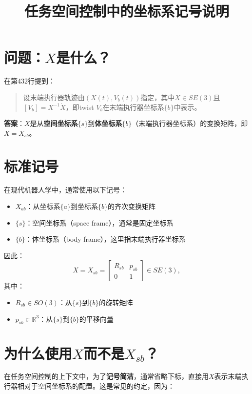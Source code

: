 \documentclass{article}
\title{任务空间控制中的坐标系记号说明}
\author{}
\date{}
\begin{document}
\maketitle

\section{问题：$X$是什么？}

在第432行提到：
\begin{quote}
设末端执行器轨迹由$(X(t), V_b(t))$指定，其中$X \in SE(3)$且$[V_b] = X^{-1}\dot{X}$，即twist $V_b$在末端执行器坐标系$\{b\}$中表示。
\end{quote}

\textbf{答案}：$X$是从\textbf{空间坐标系$\{s\}$}到\textbf{体坐标系$\{b\}$}（末端执行器坐标系）的变换矩阵，即$X = X_{sb}$。

\section{标准记号}

在现代机器人学中，通常使用以下记号：

\begin{itemize}
\item $X_{ab}$：从坐标系$\{a\}$到坐标系$\{b\}$的齐次变换矩阵
\item $\{s\}$：空间坐标系（space frame），通常是固定坐标系
\item $\{b\}$：体坐标系（body frame），这里指末端执行器坐标系
\end{itemize}

因此：
\begin{equation}
X = X_{sb} = \begin{bmatrix}
R_{sb} & p_{sb} \\
0 & 1
\end{bmatrix} \in SE(3),
\end{equation}
其中：
\begin{itemize}
\item $R_{sb} \in SO(3)$：从$\{s\}$到$\{b\}$的旋转矩阵
\item $p_{sb} \in \mathbb{R}^3$：从$\{s\}$到$\{b\}$的平移向量
\end{itemize}

\section{为什么使用$X$而不是$X_{sb}$？}

在任务空间控制的上下文中，为了\textbf{记号简洁}，通常省略下标，直接用$X$表示末端执行器相对于空间坐标系的配置。这是常见的约定，因为：
\end{document}
